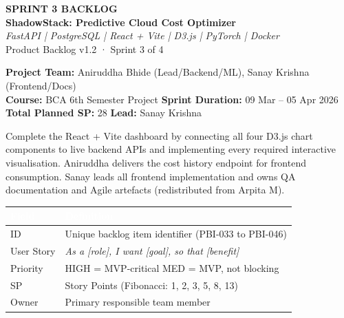 \documentclass[10pt,a4paper]{article}
\begin{document}
\begin{tcolorbox}[colback=primary, colframe=primary, arc=4pt, text fill]
  \centering\color{white}\vspace{0.5em}
  {\LARGE\bfseries SPRINT 3 BACKLOG}\\[0.4em]
  {\Large\bfseries ShadowStack: Predictive Cloud Cost Optimizer}\\[0.4em]
  \textit{FastAPI \;|\; PostgreSQL \;|\; React + Vite \;|\; D3.js \;|\; PyTorch \;|\; Docker}\\[0.3em]
  {\normalsize Product Backlog v1.2 · Sprint 3 of 4}
  \vspace{0.4em}
\end{tcolorbox}

\vspace{0.5em}
\noindent
\textbf{Project Team:} Aniruddha Bhide (Lead/Backend/ML), Sanay Krishna (Frontend/Docs)\\
\textbf{Course:} BCA 6th Semester Project
\hfill\textbf{Sprint Duration:} 09 Mar – 05 Apr 2026\\
\textbf{Total Planned SP:} 28
\hfill\textbf{Lead:} Sanay Krishna

\vspace{0.8em}

\begin{highlightbox}
Complete the React + Vite dashboard by connecting all four D3.js chart components to live backend APIs and implementing every required interactive visualisation. Aniruddha delivers the cost history endpoint for frontend consumption. Sanay leads all frontend implementation and owns QA documentation and Agile artefacts (redistributed from Arpita M).
\end{highlightbox}

\vspace{0.6em}

\begin{center}
\renewcommand{\arraystretch}{1.3}
\begin{tabular}{|L{2.5cm}|L{11.5cm}|}
\hline
{}
\textcolor{white}{\textbf{Field}} & \textcolor{white}{\textbf{Definition}} \\ \hline
ID          & Unique backlog item identifier (PBI-033 to PBI-046) \\ \hline
User Story  & \textit{As a [role], I want [goal], so that [benefit]} \\ \hline
Priority    & HIGH = MVP-critical \quad MED = MVP, not blocking \\ \hline
SP          & Story Points (Fibonacci: 1, 2, 3, 5, 8, 13) \\ \hline
Owner       & Primary responsible team member \\ \hline
\end{tabular}
\end{center}
\end{document}
